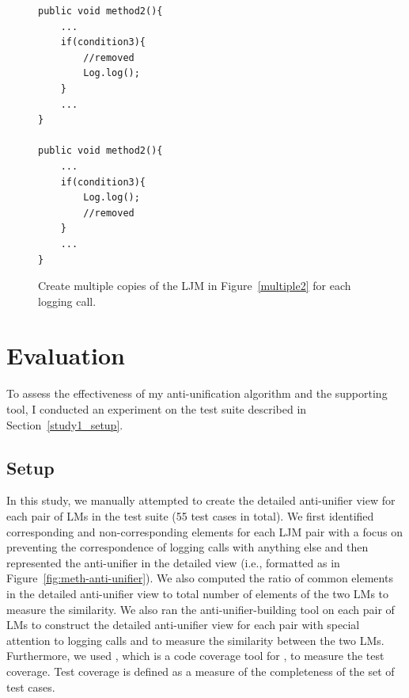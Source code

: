 \begin{figure}[H]
\def\baselinestretch{1}
\begin{lstlisting}
public void method2(){
	...
	if(condition3){
		//removed
		Log.log();
	}
	...
}

public void method2(){
	...
	if(condition3){
		Log.log();
		//removed
	}
	...
}

\end{lstlisting}
\caption{Create multiple copies of the LJM in Figure~\ref{multiple2} for each logging call.\label{multiple2-one}}
\end{figure}


\section{Evaluation} \label{anti-unifier-assessment}
To assess the effectiveness of my anti-unification algorithm and the supporting tool, I conducted an experiment on the test suite described in Section~\ref{study1_setup}. %


\subsection{Setup}  \label{study2-setup}
In this study, we manually attempted to create the detailed anti-unifier view for each pair of LMs in the test suite (55 test cases in total). We first identified corresponding and non-corresponding  elements for each LJM pair with a focus on preventing the correspondence of logging calls with anything else and then represented the anti-unifier in the detailed view (i.e., formatted as in Figure~\ref{fig:meth-anti-unifier}). We also computed the ratio of common  elements in the detailed anti-unifier view to total number of  elements of the two LMs to measure the similarity.
We also ran the anti-unifier-building tool on each pair of LMs to construct the detailed anti-unifier view for each pair with special attention to logging calls and to measure the similarity between the two LMs. Furthermore, we used , which is a  code coverage tool for , to measure the test coverage. Test coverage is defined as a measure of the completeness of the set of test cases.



